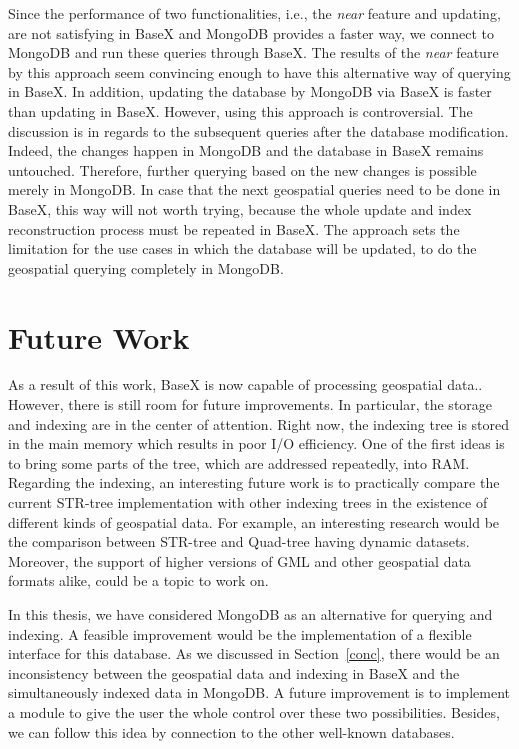 \documentclass[a4paper,12pt]{article}
\begin{document}
Since the performance of two functionalities, i.e., the \textit{near} feature and updating, are not satisfying in BaseX and MongoDB provides a faster way, we connect to MongoDB and run these queries through BaseX. The results of the \textit{near} feature by this approach seem convincing enough to have this alternative way of querying in BaseX. In addition, updating the database by MongoDB via BaseX is faster than updating in BaseX. However, using this approach is controversial. The discussion is in regards to the subsequent queries after the database modification. Indeed, the changes happen in MongoDB and the database in BaseX remains untouched. Therefore, further querying based on the new changes is possible merely in MongoDB. In case that the next geospatial queries need to be done in BaseX, this way will not worth trying, because the whole update and index reconstruction process must be repeated in BaseX. The approach sets the limitation for the use cases in which the database will be updated, to do the geospatial querying completely in MongoDB.


\newpage
\section{Future Work}
\label{s.future}
As a result of this work, BaseX is now capable of processing geospatial data..
However, there is still room for future improvements. 
In particular, the storage and indexing are in the center of attention.
Right now, the indexing tree is stored in the main memory 
which results in poor I/O efficiency. %
One of the first ideas is to bring some parts of the tree, 
which are addressed repeatedly, into RAM.
Regarding the indexing, an interesting future work is to practically compare 
the current STR-tree implementation with other indexing trees in the existence of
different kinds of geospatial data. For example, an interesting research would be
the comparison between STR-tree and Quad-tree having dynamic datasets.
Moreover, the support of higher versions of GML and other geospatial data 
formats alike, could be a topic to work on.

In this thesis, we have considered MongoDB as an alternative for querying and indexing.
A feasible improvement would be the implementation of a flexible interface
for this database. As we discussed in Section~\ref{conc}, 
there would be an inconsistency between 
the geospatial data and indexing in BaseX and
the simultaneously indexed data in MongoDB. A future improvement is to 
implement a module to give the user the whole control over these two possibilities.
Besides, we can follow this idea by connection to the other well-known databases.
\end{document}

